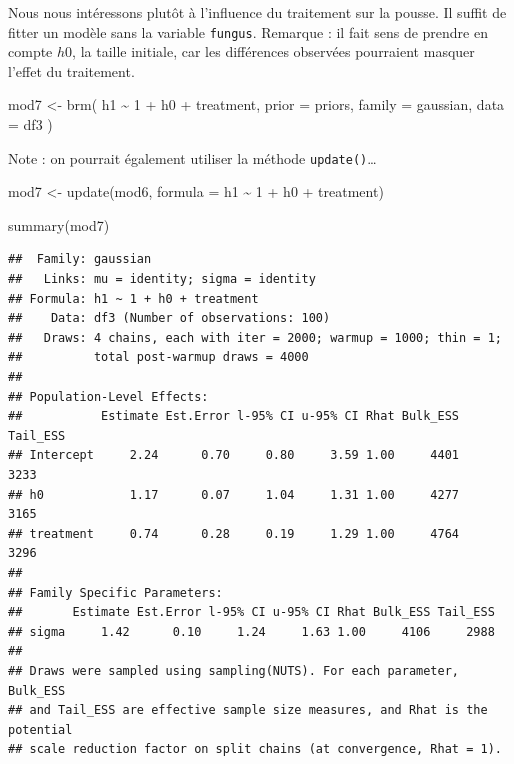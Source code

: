 \documentclass[
  a4paper,11pt,twoside,onecolumn,openright,final,oldfontcommands]{memoir}
\newenvironment{Shaded}{\begin{snugshade}}{\end{snugshade}}
\newcommand{\AttributeTok}[1]{\textcolor[rgb]{0.77,0.63,0.00}{#1}}
\newcommand{\DecValTok}[1]{\textcolor[rgb]{0.00,0.00,0.81}{#1}}
\newcommand{\FunctionTok}[1]{\textcolor[rgb]{0.00,0.00,0.00}{#1}}
\newcommand{\NormalTok}[1]{#1}
\newcommand{\OtherTok}[1]{\textcolor[rgb]{0.56,0.35,0.01}{#1}}
\newcommand{\SpecialCharTok}[1]{\textcolor[rgb]{0.00,0.00,0.00}{#1}}
\theoremstyle{definition}
\theoremstyle{definition}
\theoremstyle{definition}
\theoremstyle{definition}
\theoremstyle{remark}
\begin{document}
Nous nous intéressons plutôt à l'influence du traitement sur la pousse. Il suffit de fitter un modèle sans la variable \texttt{fungus}. Remarque : il fait sens de prendre en compte \(h0\), la taille initiale, car les différences observées pourraient masquer l'effet du traitement.

\begin{Shaded}
\begin{Highlighting}[]
\NormalTok{mod7 }\OtherTok{\textless{}{-}} \FunctionTok{brm}\NormalTok{(}
\NormalTok{  h1 }\SpecialCharTok{\textasciitilde{}} \DecValTok{1} \SpecialCharTok{+}\NormalTok{ h0 }\SpecialCharTok{+}\NormalTok{ treatment,}
  \AttributeTok{prior =}\NormalTok{ priors,}
  \AttributeTok{family =}\NormalTok{ gaussian,}
  \AttributeTok{data =}\NormalTok{ df3}
\NormalTok{  )}
\end{Highlighting}
\end{Shaded}

Note : on pourrait également utiliser la méthode \texttt{update()}\ldots{}

\begin{Shaded}
\begin{Highlighting}[]
\NormalTok{mod7 }\OtherTok{\textless{}{-}} \FunctionTok{update}\NormalTok{(mod6, }\AttributeTok{formula =}\NormalTok{ h1 }\SpecialCharTok{\textasciitilde{}} \DecValTok{1} \SpecialCharTok{+}\NormalTok{ h0 }\SpecialCharTok{+}\NormalTok{ treatment)}
\end{Highlighting}
\end{Shaded}

\begin{Shaded}
\begin{Highlighting}[]
\FunctionTok{summary}\NormalTok{(mod7)}
\end{Highlighting}
\end{Shaded}

\begin{verbatim}
##  Family: gaussian 
##   Links: mu = identity; sigma = identity 
## Formula: h1 ~ 1 + h0 + treatment 
##    Data: df3 (Number of observations: 100) 
##   Draws: 4 chains, each with iter = 2000; warmup = 1000; thin = 1;
##          total post-warmup draws = 4000
## 
## Population-Level Effects: 
##           Estimate Est.Error l-95% CI u-95% CI Rhat Bulk_ESS Tail_ESS
## Intercept     2.24      0.70     0.80     3.59 1.00     4401     3233
## h0            1.17      0.07     1.04     1.31 1.00     4277     3165
## treatment     0.74      0.28     0.19     1.29 1.00     4764     3296
## 
## Family Specific Parameters: 
##       Estimate Est.Error l-95% CI u-95% CI Rhat Bulk_ESS Tail_ESS
## sigma     1.42      0.10     1.24     1.63 1.00     4106     2988
## 
## Draws were sampled using sampling(NUTS). For each parameter, Bulk_ESS
## and Tail_ESS are effective sample size measures, and Rhat is the potential
## scale reduction factor on split chains (at convergence, Rhat = 1).
\end{verbatim}
\end{document}
